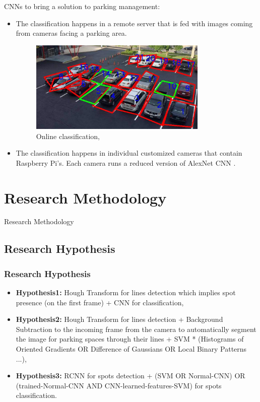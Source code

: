 \documentclass{beamer}
\begin{document}
\begin{frame}[allowframebreaks]
CNNs to bring a solution to parking management:

\begin{itemize}
	\item The classification happens in a remote server that is fed with images coming from cameras facing a parking area. 
	\begin{figure}[h!]
		\centering
		\includegraphics[width=0.8\textwidth]{Pictures/stall}
		\caption{Online classification, \cite{7845408}}
	\end{figure} 
	\item The classification happens in individual customized cameras that contain Raspberry Pi's. Each camera runs a reduced version of AlexNet CNN \cite{Amato2017327}. 
\end{itemize}


\end{frame}

\section{Research Methodology}

\begin{frame}
\Huge Research Methodology
\end{frame}

\subsection{Research Hypothesis}

\begin{frame}
\frametitle{Research Hypothesis}
\begin{itemize}
	\item \textbf{Hypothesis1: }Hough Transform for lines detection which implies spot presence (on the first frame) + CNN for classification,
	\item \textbf{Hypothesis2: }Hough Transform for lines detection + Background Subtraction to the incoming frame from the camera to automatically segment the image for parking spaces through their lines + SVM * (Histograms of Oriented Gradients OR  Difference of Gaussians OR Local Binary Patterns ...),
	\item \textbf{Hypothesis3: } RCNN for spots detection + (SVM OR Normal-CNN) OR (trained-Normal-CNN AND CNN-learned-features-SVM) for spots classification.
\end{itemize}

\end{frame}
\end{document}
